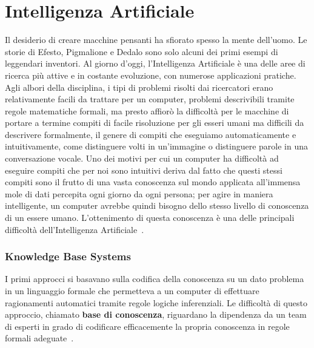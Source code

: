 \documentclass[12pt,a4paper]{report}
\begin{document}
    \section{Intelligenza Artificiale}
    Il desiderio di creare macchine pensanti ha sfiorato spesso la
    mente dell'uomo. Le storie di Efesto, Pigmalione e Dedalo sono
    solo alcuni dei primi esempi di leggendari inventori. 
    Al giorno d'oggi, l'Intelligenza Artificiale \`e una delle 
    aree di ricerca pi\`u attive e in costante evoluzione,
    con numerose applicazioni pratiche. Agli albori della 
    disciplina, i tipi di problemi risolti dai ricercatori erano
    relativamente facili da trattare per un computer, problemi 
    descrivibili tramite regole matematiche formali, ma presto 
    affior\`o la difficolt\`a per le macchine di portare a termine 
    compiti di facile risoluzione per gli esseri umani ma difficili da 
    descrivere formalmente, il genere di compiti che eseguiamo 
    automaticamente e intuitivamente, come distinguere volti in 
    un'immagine o distinguere parole in una conversazione vocale. 
    Uno dei motivi per cui un computer ha difficolt\`a ad 
    eseguire compiti che per noi sono intuitivi deriva dal fatto che 
    questi stessi compiti sono il frutto di una vasta conoscenza sul 
    mondo applicata all'immensa mole di dati percepita ogni giorno da 
    ogni persona; per agire in maniera intelligente, un computer 
    avrebbe quindi bisogno dello stesso livello di conoscenza di
    un essere umano. L'ottenimento di questa conoscenza \`e una 
    delle principali difficolt\`a dell'Intelligenza Artificiale~\cite{Goodfellow-et-al-2016}.

    \subsubsection{Knowledge Base Systems}
    I primi approcci si basavano sulla codifica della conoscenza su
    un dato problema in un linguaggio formale che permetteva a un
    computer di effettuare ragionamenti automatici tramite regole
    logiche inferenziali. Le difficolt\`a di questo approccio, 
    chiamato \textbf{base di conoscenza}, riguardano la dipendenza
    da un team di esperti in grado di codificare efficacemente la
    propria conoscenza in regole formali adeguate~\cite{Lenat:1989:BLK:575523}.
\end{document}
